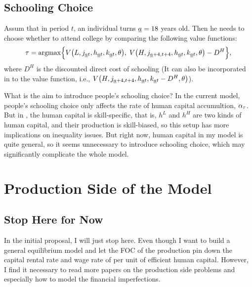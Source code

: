 \documentclass[12pt]{article}
\newcommand{\highlightR}[1]{{\color{MyRed}{#1}}}
\theoremstyle{definition}
\begin{document}
\begin{spacing}{1}
\subsection{Schooling Choice}

Assum that in period $t$, an individual turns $\underline{a}=18$ years old. Then he needs to choose whether to attend college by comparing the following value functions:
\begin{equation}
	\tau = \operatorname*{argmax} \Bigl\{V{\left( L, j_{\underline{a}t}, h_{{\underline{a}t}}, k_{\underline{a}t}, \theta \right)},\; V{\left( H, j_{\underline{a}+4, t+4}, h_{{\underline{a}t}}, k_{\underline{a}t}, \theta \right)} - D^H\Bigl\} ,
\end{equation}
where $D^H$ is the discounted direct cost of schooling (It can also be incorporated in to the value function, i.e., $V{\left( H, j_{\underline{a}+4, t+4}, h_{{\underline{a}t}}, k_{\underline{a}t}-D^H, \theta \right)}$). 

\highlightR{Questions:} What is the aim to introduce people's schooling choice? In the current model, people's schooling choice only affects the rate of human capital accumultion, $\alpha_\tau$. But in \citet{heckman1998}, the human capital is skill-specific, that is, $h^L$ and $h^H$ are two kinds of human capital, and their production is skill-biased, so this setup has more implications on inequality issues. But right now, human capital in my model is quite general, so it seems unnecessary to introduce schooling choice, which may significantly complicate the whole model. 

\highlightR{Maybe I should check the data and see if there is a significant difference in sector mobility patterns and wage process across different skill groups defined by education level! And then decide whether to explicitly model people's schooling choice.}

\section{Production Side of the Model}

\subsection{Stop Here for Now}

In the initial proposal, I will just stop here. Even though I want to build a general equilibrium model and let the FOC of the production pin down the capital rental rate and wage rate of per unit of efficient human capital. However, I find it necessary to read more papers on the production side problems and especially how to model the financial imperfections. 


\end{spacing}
\end{document}
